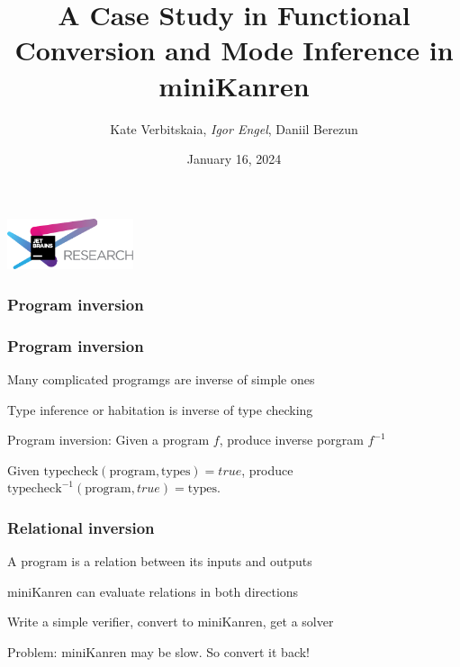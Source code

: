 \documentclass[xcolor=table, aspectratio=169]{beamer}
\title[Functional Conversion for miniKanren]{A Case Study in Functional Conversion and Mode Inference in miniKanren}
\institute[JetBrains Research]{
JetBrains Research

\vspace{1cm}
PEPM @ POPL 2024
}
\author[Igor]{Kate Verbitskaia, \emph{Igor Engel}, Daniil Berezun}
\date{January 16, 2024}
\begin{document}
{
\begin{frame}[fragile]
   \begin{center}
      \includegraphics[height=1.5cm]{pictures/jetbrainsResearch.pdf}
    \end{center}
  \titlepage
\end{frame}
}




\begin{frame}[fragile]
    \frametitle{Program inversion}
\end{frame}
\begin{frame}[fragile]
    \frametitle{Program inversion}
    \begin{center}
        Many complicated programgs are inverse of simple ones
    \end{center}
    \vfill
    \begin{center}
        Type inference or habitation is inverse of type checking
    \end{center}
    \vfill
    \begin{center}
        Program inversion: Given a program $f$, produce inverse porgram  $f^{-1}$
    \end{center}
    \vfill
    \begin{center}
        Given $\text{typecheck}(\text{program}, \text{types}) = true$, produce $\text{typecheck}^{-1}(\text{program}, true) = \text{types}$.
    \end{center}
\end{frame}
\begin{frame}[fragile]
    \frametitle{Relational inversion}
    \begin{center}
        A program is a relation between its inputs and outputs
    \end{center}
    \vfill
    \begin{center}
        miniKanren can evaluate relations in both directions
    \end{center}
    \vfill
    \begin{center}
        Write a simple verifier, convert to miniKanren, get a solver
    \end{center}
    \vfill
    \begin{center}
        Problem: miniKanren may be slow. So convert it back!
    \end{center}
\end{frame}
\end{document}
